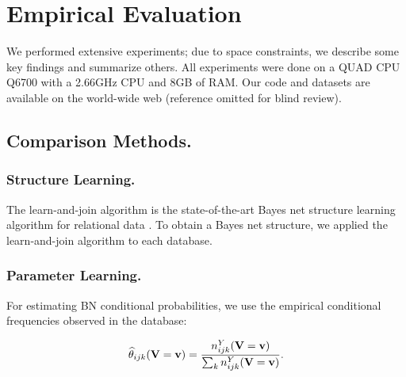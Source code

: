 \documentclass{article}
\begin{document}
\section{Empirical Evaluation}
We performed extensive experiments; due to space constraints, we describe some key findings and summarize others.
All experiments were done on a QUAD CPU Q6700 with a 2.66GHz CPU and 8GB of RAM. Our code and datasets are available on the world-wide web (reference omitted for blind review).



\subsection{Comparison Methods.}

\subsubsection{Structure Learning.} The learn-and-join algorithm is the state-of-the-art Bayes net structure learning algorithm for relational data \cite{Schulte2012}. To obtain a Bayes net structure, we applied the learn-and-join algorithm to each database.
%

\subsubsection{Parameter Learning.} For estimating BN conditional probabilities, we use the empirical conditional frequencies observed in the database:

\begin{equation*} \label{eq:frequencies}
\widehat{\theta}_{ijk}(\mathbf{V} = \mathbf{v}) = \frac{n^{Y}_{ijk}(\mathbf{V} = \mathbf{v})}{\sum_{k}n^{Y}_{ijk}(\mathbf{V} = \mathbf{v})}.
\end{equation*}
\end{document}

